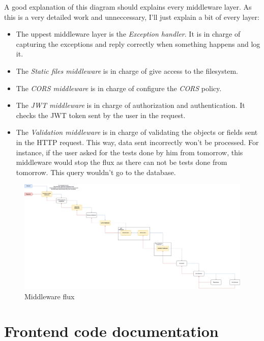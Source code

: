    A good explanation of this diagram should explains every middleware layer. As this is a very detailed work and unneccessary, I'll just explain a bit of every layer:
    \begin{itemize}
        \item The uppest middleware layer is the \textit{Exception handler}. It is in charge of capturing the exceptions and reply correctly when something happens and log it.
        \item The \textit{Static files middleware} is in charge of give access to the filesystem. \\
        \item The \textit{CORS middleware} is in charge of configure the \textit{CORS} policy. \\
        \item The \textit{JWT middleware} is in charge of authorization and authentication. It checks the {JWT token} sent by the user in the request. 
        \item The \textit{Validation middleware} is in charge of validating the objects or fields sent in the {HTTP request}. This way, data sent incorrectly won't be processed. For instance, if the user asked for the tests done by him from tomorrow, this middleware would stop the flux as there can not be tests done from tomorrow. This query wouldn't go to the database. 
    \end{itemize}
        \newpage
        \begin{figure}[H]
            \centering
                \includegraphics[angle=90, width=\textwidth, height=\textheight]{assets/diagrams/middleware.png}
            \caption{Middleware flux}
            \label{fig:implementation_middleware}
        \end{figure}

\section{Frontend code documentation}
